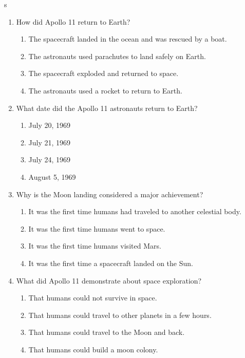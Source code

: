 s\documentclass[12pt]{article}
\begin{document}
\begin{enumerate}
    \item How did Apollo 11 return to Earth?
    \begin{enumerate}[label=\Alph*.]
        \item The spacecraft landed in the ocean and was rescued by a boat.
        \item The astronauts used parachutes to land safely on Earth.
        \item The spacecraft exploded and returned to space.
        \item The astronauts used a rocket to return to Earth.
    \end{enumerate}
    \vspace{0.5cm}

    \item What date did the Apollo 11 astronauts return to Earth?
    \begin{enumerate}[label=\Alph*.]
        \item July 20, 1969
        \item July 21, 1969
        \item July 24, 1969
        \item August 5, 1969
    \end{enumerate}
    \vspace{0.5cm}

    \item Why is the Moon landing considered a major achievement?
    \begin{enumerate}[label=\Alph*.]
        \item It was the first time humans had traveled to another celestial body.
        \item It was the first time humans went to space.
        \item It was the first time humans visited Mars.
        \item It was the first time a spacecraft landed on the Sun.
    \end{enumerate}
    \vspace{0.5cm}

    \item What did Apollo 11 demonstrate about space exploration?
    \begin{enumerate}[label=\Alph*.]
        \item That humans could not survive in space.
        \item That humans could travel to other planets in a few hours.
        \item That humans could travel to the Moon and back.
        \item That humans could build a moon colony.
    \end{enumerate}
    \vspace{0.5cm}


\end{enumerate}
\end{document}
